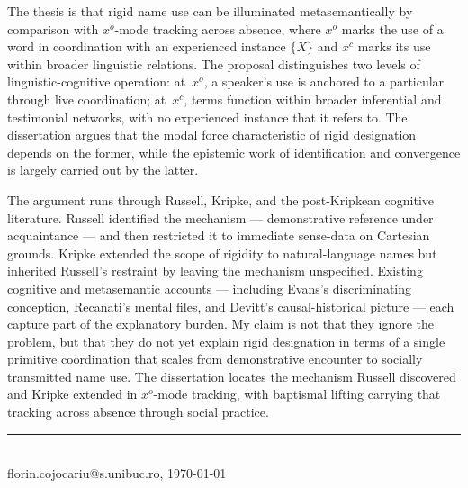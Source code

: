 \documentclass[11pt]{article}
\begin{document}
The thesis is that rigid name use can be illuminated metasemantically by comparison with \(x^o\)-mode tracking across absence, where \(x^o\) marks the use of a word in coordination with an experienced instance \(\{X\}\) and \(x^c\) marks its use within broader linguistic relations. The proposal distinguishes two levels of linguistic-cognitive operation: at~\(x^o\), a speaker's use is anchored to a particular through live coordination; at~\(x^c\), terms function within broader inferential and testimonial networks, with no experienced instance that it refers to. The dissertation argues that the modal force characteristic of rigid designation depends on the former, while the epistemic work of identification and convergence is largely carried out by the latter.

The argument runs through Russell, Kripke, and the post-Kripkean cognitive literature. Russell identified the mechanism --- demonstrative reference under acquaintance --- and then restricted it to immediate sense-data on Cartesian grounds. Kripke extended the scope of rigidity to natural-language names but inherited Russell's restraint by leaving the mechanism unspecified. Existing cognitive and metasemantic accounts --- including Evans's discriminating conception, Recanati's mental files, and Devitt's causal-historical picture --- each capture part of the explanatory burden. My claim is not that they ignore the problem, but that they do not yet explain rigid designation in terms of a single primitive coordination that scales from demonstrative encounter to socially transmitted name use. The dissertation locates the mechanism Russell discovered and Kripke extended in \(x^o\)-mode tracking, with baptismal lifting carrying that tracking across absence through social practice.

\vfill
\noindent\rule{\textwidth}{0.4pt}\\[2pt]
{\tiny florin.cojocariu@s.unibuc.ro, \today}
\end{document}
